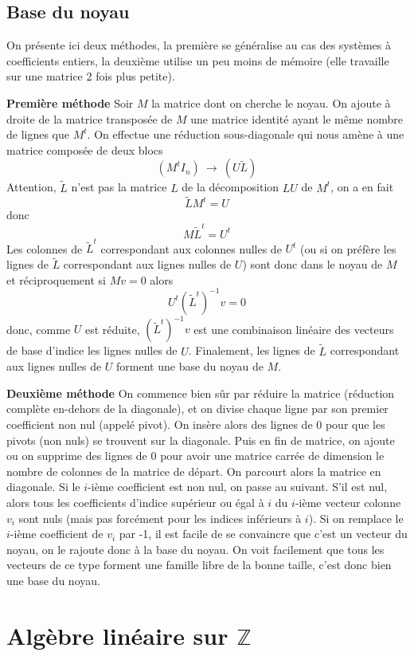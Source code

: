 \documentclass[a4paper,11pt]{book}
\begin{document}
\begin{giacjshere}
\subsection{Base du noyau}
On pr\'esente ici deux m\'ethodes, la premi\`ere se g\'en\'eralise
au cas des syst\`emes \`a coefficients entiers, la deuxi\`eme
utilise un peu moins de m\'emoire (elle travaille sur une matrice 2 fois
plus petite).

{\bf Premi\`ere m\'ethode}
Soir $M$ la matrice dont on cherche le noyau. On ajoute \`a droite
de la matrice transpos\'ee de $M$ une matrice identit\'e ayant
le m\^eme nombre de lignes que $M^t$. On effectue une r\'eduction
sous-diagonale qui nous am\`ene \`a une matrice compos\'ee de deux
blocs
\[ ( M^t I_n ) \ \rightarrow \ ( U \tilde{L} ) \]
Attention, $\tilde{L}$ n'est pas la matrice $L$ de la d\'ecomposition $LU$
de $M^t$, on a en fait
\[ \tilde{L} M^t = U\]
donc
\[ M \tilde{L}^t = U^t \]
Les colonnes de $\tilde{L}^t$ correspondant aux colonnes nulles de $U^t$ 
(ou si on pr\'ef\`ere les lignes de $\tilde{L}$ correspondant
aux lignes nulles de $U$) sont donc dans le noyau de $M$ et r\'eciproquement
si $Mv=0$ alors 
\[ U^t (\tilde{L}^t)^{-1} v =0 \]
donc, comme $U$ est r\'eduite, $(\tilde{L}^t)^{-1} v$ est une combinaison
lin\'eaire des vecteurs de base d'indice les lignes nulles de $U$.
Finalement, les lignes de $\tilde{L}$ correspondant
aux lignes nulles de $U$ forment une base du noyau de $M$.


{\bf Deuxi\`eme m\'ethode}
On commence bien sûr par réduire la matrice (réduction complète
en-dehors de la diagonale), et on divise chaque ligne par son
premier coefficient non nul (appelé pivot). On insère alors
des lignes de 0 pour que les pivots (non nuls) se trouvent
sur la diagonale. Puis en fin de matrice, on ajoute ou on supprime des 
lignes de 0 pour avoir une matrice carrée de dimension le nombre de colonnes
de la matrice de départ.
On parcourt alors la matrice en diagonale. Si
le $i$-ième coefficient est non nul, on passe au suivant. 
S'il est nul, alors tous
les coefficients d'indice supérieur ou égal à $i$ du $i$-ième
vecteur colonne $v_i$ sont nuls (mais pas forcément pour les indices
inférieurs à $i$). Si on remplace le $i$-ième coefficient de $v_i$
par -1, il est facile de se convaincre que c'est un vecteur du noyau,
on le rajoute donc à la base du noyau. On voit facilement
que tous les vecteurs de ce type forment une famille libre de
la bonne taille, c'est donc bien une base du noyau.


\section{Alg\`ebre lin\'eaire sur $\mathbb{Z}$}


\end{giacjshere}
\end{document}
